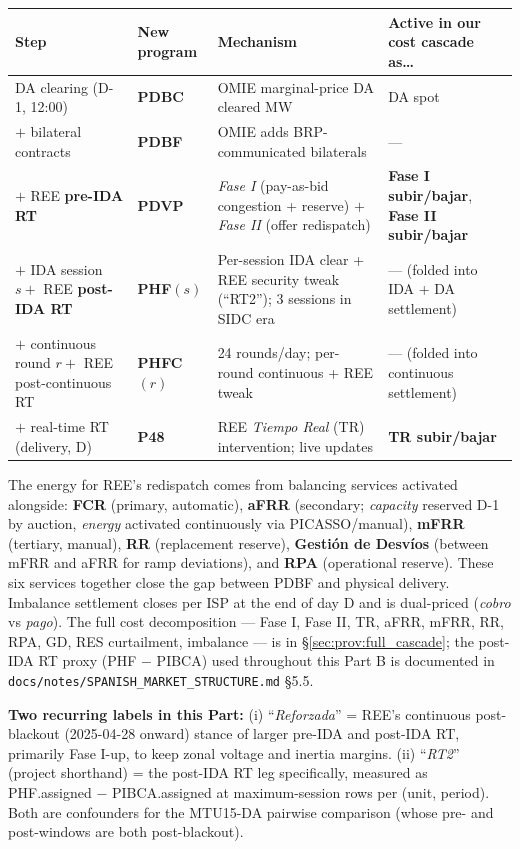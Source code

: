 \documentclass[11pt,a4paper]{article}
\begin{document}
\begin{center}\scriptsize
\setlength{\tabcolsep}{4pt}
\begin{tabular}{l l l l}
\toprule
Step & New program & Mechanism & Active in our cost cascade as\ldots \\
\midrule
DA clearing (D-1, 12:00) & \textbf{PDBC} & OMIE marginal-price DA cleared MW & DA spot \\
\quad $+$ bilateral contracts & \textbf{PDBF} & OMIE adds BRP-communicated bilaterals & --- \\
\quad $+$ REE \textbf{pre-IDA RT} & \textbf{PDVP} & \emph{Fase I} (pay-as-bid congestion + reserve) $+$ \emph{Fase II} (offer redispatch) & \textbf{Fase I subir/bajar}, \textbf{Fase II subir/bajar} \\
\quad $+$ IDA session $s + $ REE \textbf{post-IDA RT} & \textbf{PHF}$(s)$ & Per-session IDA clear + REE security tweak (``RT2''); 3 sessions in SIDC era & --- (folded into IDA + DA settlement) \\
\quad $+$ continuous round $r + $ REE post-continuous RT & \textbf{PHFC}$(r)$ & 24 rounds/day; per-round continuous + REE tweak & --- (folded into continuous settlement) \\
\quad $+$ real-time RT (delivery, D) & \textbf{P48} & REE \emph{Tiempo Real} (TR) intervention; live updates & \textbf{TR subir/bajar} \\
\bottomrule
\end{tabular}
\end{center}

\noindent The energy for REE's redispatch comes from balancing services activated alongside: \textbf{FCR} (primary, automatic), \textbf{aFRR} (secondary; \emph{capacity} reserved D-1 by auction, \emph{energy} activated continuously via PICASSO/manual), \textbf{mFRR} (tertiary, manual), \textbf{RR} (replacement reserve), \textbf{Gestión de Desvíos} (between mFRR and aFRR for ramp deviations), and \textbf{RPA} (operational reserve). These six services together close the gap between PDBF and physical delivery. Imbalance settlement closes per ISP at the end of day D and is dual-priced (\emph{cobro} vs \emph{pago}). The full cost decomposition --- Fase I, Fase II, TR, aFRR, mFRR, RR, RPA, GD, RES curtailment, imbalance --- is in \S\ref{sec:prov:full_cascade}; the post-IDA RT proxy (PHF $-$ PIBCA) used throughout this Part B is documented in \texttt{docs/notes/SPANISH\_MARKET\_STRUCTURE.md} \S5.5.

\textbf{Two recurring labels in this Part:} (i) ``\emph{Reforzada}'' = REE's continuous post-blackout (2025-04-28 onward) stance of larger pre-IDA and post-IDA RT, primarily Fase I-up, to keep zonal voltage and inertia margins. (ii) ``\emph{RT2}'' (project shorthand) = the post-IDA RT leg specifically, measured as PHF.assigned $-$ PIBCA.assigned at maximum-session rows per (unit, period). Both are confounders for the MTU15-DA pairwise comparison (whose pre- and post-windows are both post-blackout).
\end{document}
